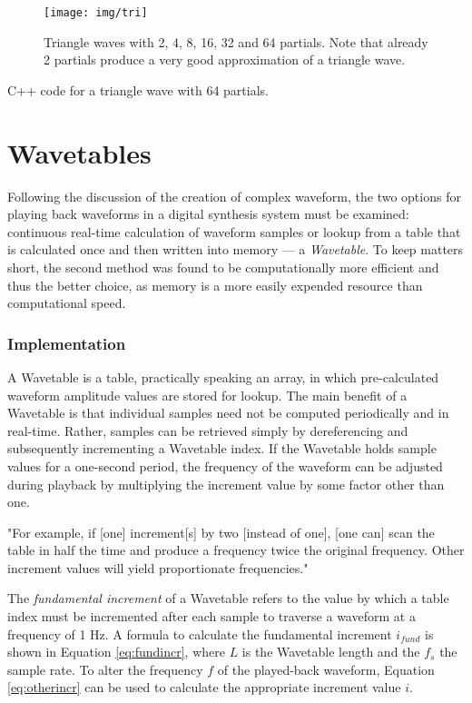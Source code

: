 \pagebreak

\begin{figure}[h!]
  \texttt{[image: img/tri]}
  \caption{Triangle waves with 2, 4, 8, 16, 32 and 64 partials. Note that already 2 partials produce a very good approximation of a triangle wave.}
  \label{fig:tri}
\end{figure}

\begin{table}[h!]
  \caption{C++ code for a triangle wave with 64 partials.}
  \label{code:atri}
\end{table}

\pagebreak

\section{Wavetables}

Following the discussion of the creation of complex waveform, the two options for playing back waveforms in a digital synthesis system must be examined: continuous real-time calculation of waveform samples or lookup from a table that is calculated once and then written into memory --- a \emph{Wavetable}. To keep matters short, the second method was found to be computationally more efficient and thus the better choice, as memory is a more easily expended resource than computational speed.

\subsubsection{Implementation}

A Wavetable is a table, practically speaking an array, in which pre-calculated waveform amplitude values are stored for lookup. The main benefit of a Wavetable is that individual samples need not be computed periodically and in real-time. Rather, samples can be retrieved simply by dereferencing and subsequently incrementing a Wavetable index. If the Wavetable holds sample values for a one-second period, the frequency of the waveform can be adjusted during playback by multiplying the increment value by some factor other than one.
\begin{blockquote}
  "For example, if [one] increment[s] by two [instead of one], [one can] scan the table in half the time and produce a frequency twice the original frequency. Other increment values will yield proportionate frequencies." 
\end{blockquote}
The \emph{fundamental increment} of a Wavetable refers to the value by which a table index must be incremented after each sample to traverse a waveform at a frequency of 1 Hz. A formula to calculate the fundamental increment $i_{fund}$ is shown in Equation \ref{eq:fundincr}, where $L$ is the Wavetable length and the $f_{s}$ the sample rate. To alter the frequency $f$ of the played-back waveform, Equation \ref{eq:otherincr} can be used to calculate the appropriate increment value $i$.

